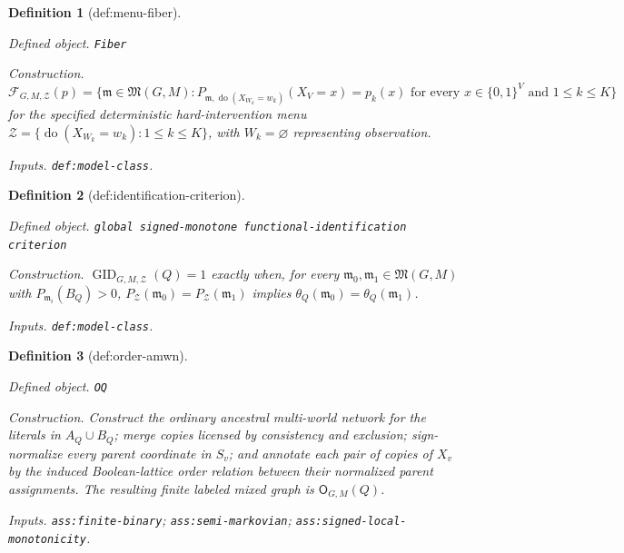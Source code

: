\documentclass{article}
\newtheorem{definition}{Definition}
\begin{document}
\begin{definition}[def:menu-fiber]\label{def:menu-fiber}
\par\smallskip\noindent\emph{Defined object.} \texttt{Fiber}
\par\smallskip\noindent\emph{Construction.} \(\mathcal F_{G,M,\mathcal Z}(p)=\{\mathfrak m\in\mathfrak M(G,M):P_{\mathfrak m,\operatorname{do}(X_{W_k}=w_k)}(X_V=x)=p_k(x)\text{ for every }x\in\{0,1\}^{V}\text{ and }1\le k\le K\}\) for the specified deterministic hard-intervention menu \(\mathcal Z=\{\operatorname{do}(X_{W_k}=w_k):1\le k\le K\}\), with \(W_k=\varnothing\) representing observation.
\par\smallskip\noindent\emph{Inputs.} \texttt{def:\allowbreak{}model-\allowbreak{}class}.
\end{definition}

\begin{definition}[def:identification-criterion]\label{def:identification-criterion}
\par\smallskip\noindent\emph{Defined object.} \texttt{global signed-\allowbreak{}monotone functional-\allowbreak{}identification criterion}
\par\smallskip\noindent\emph{Construction.} \(\operatorname{GID}_{G,M,\mathcal Z}(Q)=1\) exactly when, for every \(\mathfrak m_0,\mathfrak m_1\in\mathfrak M(G,M)\) with \(P_{\mathfrak m_i}(B_Q)>0\), \(P_{\mathcal Z}(\mathfrak m_0)=P_{\mathcal Z}(\mathfrak m_1)\) implies \(\theta_Q(\mathfrak m_0)=\theta_Q(\mathfrak m_1)\).
\par\smallskip\noindent\emph{Inputs.} \texttt{def:\allowbreak{}model-\allowbreak{}class}.
\end{definition}

\begin{definition}[def:order-amwn]\label{def:order-amwn}
\par\smallskip\noindent\emph{Defined object.} \texttt{OQ}
\par\smallskip\noindent\emph{Construction.} Construct the ordinary ancestral multi-world network for the literals in \(A_Q\cup B_Q\); merge copies licensed by consistency and exclusion; sign-normalize every parent coordinate in \(S_v\); and annotate each pair of copies of \(X_v\) by the induced Boolean-lattice order relation between their normalized parent assignments. The resulting finite labeled mixed graph is \(\mathsf O_{G,M}(Q)\).
\par\smallskip\noindent\emph{Inputs.} \texttt{ass:\allowbreak{}finite-\allowbreak{}binary}; \texttt{ass:\allowbreak{}semi-\allowbreak{}markovian}; \texttt{ass:\allowbreak{}signed-\allowbreak{}local-\allowbreak{}monotonicity}.
\end{definition}
\end{document}
